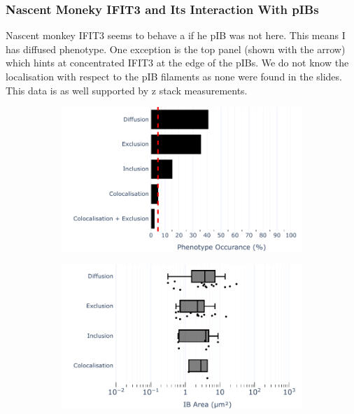 \subsubsection{Nascent Moneky IFIT3 and Its Interaction With pIBs}
Nascent monkey IFIT3 seems to behave a if he pIB was not here. This means I has diffused phenotype. One exception is the top panel (shown with the arrow) which hints at concentrated IFIT3 at the edge of the pIBs. We do not know the localisation with respect to the pIB filaments as none were found in the slides. This data is as well supported by z stack measurements.

\begin{figure}
    \begin{subfigure}{0.495\textwidth}
        \caption{}
        \includegraphics[width=1\linewidth]{08. Chapter 3/Figs/03. pIB/04. IFIT3/01. bar_i3_vero.pdf} 
    \end{subfigure}
    \begin{subfigure}{0.495\textwidth}
        \caption{}
        \includegraphics[width=1\linewidth]{08. Chapter 3/Figs/03. pIB/04. IFIT3/02. box_i3_vero.pdf}

\end{subfigure}
\end{figure}
